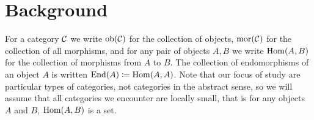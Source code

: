 \chapter{Background}
\label{chapter:background}

For a category $\mathcal{C}$ we write $\operatorname{ob}(\mathcal{C})$ for the collection of objects, $\operatorname{mor}(\mathcal{C})$ for the collection of all morphisms, and for any pair of objects $A,B$ we write $\operatorname{Hom}(A,B)$ for the collection of morphisms from $A$ to $B$. The collection of endomorphisms of an object $A$ is written $\operatorname{End}(A) \coloneqq \operatorname{Hom}(A,A)$. Note that our focus of study are particular types of categories, not categories in the abstract sense, so we will assume that all categories we encounter are locally small, that is for any objects $A$ and $B$, $\operatorname{Hom}(A,B)$ is a set.






